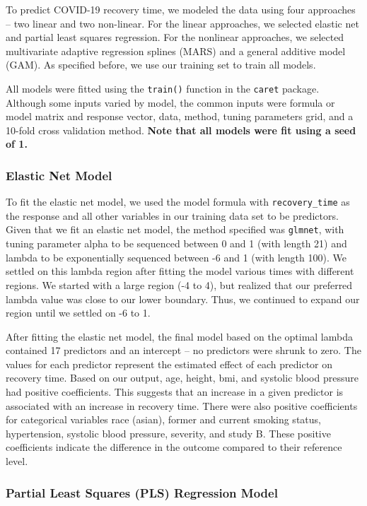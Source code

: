 \documentclass[
]{article}
\begin{document}
To predict COVID-19 recovery time, we modeled the data using four
approaches -- two linear and two non-linear. For the linear approaches,
we selected elastic net and partial least squares regression. For the
nonlinear approaches, we selected multivariate adaptive regression
splines (MARS) and a general additive model (GAM). As specified before,
we use our training set to train all models.

All models were fitted using the \texttt{train()} function in the
\texttt{caret} package. Although some inputs varied by model, the common
inputs were formula or model matrix and response vector, data, method,
tuning parameters grid, and a 10-fold cross validation method.
\textbf{Note that all models were fit using a seed of 1.}

\hypertarget{elastic-net-model}{%
\subsubsection{Elastic Net Model}\label{elastic-net-model}}

To fit the elastic net model, we used the model formula with
\texttt{recovery\_time} as the response and all other variables in our
training data set to be predictors. Given that we fit an elastic net
model, the method specified was \texttt{glmnet}, with tuning parameter
alpha to be sequenced between 0 and 1 (with length 21) and lambda to be
exponentially sequenced between -6 and 1 (with length 100). We settled
on this lambda region after fitting the model various times with
different regions. We started with a large region (-4 to 4), but
realized that our preferred lambda value was close to our lower
boundary. Thus, we continued to expand our region until we settled on -6
to 1.

After fitting the elastic net model, the final model based on the
optimal lambda contained 17 predictors and an intercept -- no predictors
were shrunk to zero. The values for each predictor represent the
estimated effect of each predictor on recovery time. Based on our
output, age, height, bmi, and systolic blood pressure had positive
coefficients. This suggests that an increase in a given predictor is
associated with an increase in recovery time. There were also positive
coefficients for categorical variables race (asian), former and current
smoking status, hypertension, systolic blood pressure, severity, and
study B. These positive coefficients indicate the difference in the
outcome compared to their reference level.

\hypertarget{partial-least-squares-pls-regression-model}{%
\subsubsection{Partial Least Squares (PLS) Regression
Model}\label{partial-least-squares-pls-regression-model}}
\end{document}
